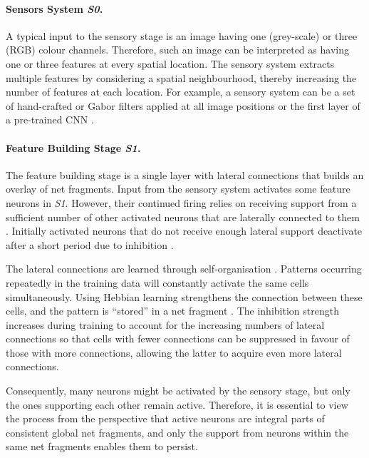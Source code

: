 \paragraph{Sensors System \emph{S0}.} A typical input to the sensory stage is an image having one (grey-scale) or three (RGB) colour channels. Therefore, such an image can be interpreted as having one or three features at every spatial location.
The sensory system extracts multiple features by considering a spatial neighbourhood, thereby increasing the number of features at each location.
For example, a sensory system can be a set of hand-crafted or Gabor filters  applied at all image positions or the first layer of a pre-trained CNN .

\paragraph{Feature Building Stage \emph{S1}.} The feature building stage is a single layer with lateral connections  that builds an overlay of net fragments. Input from the sensory system activates some feature neurons in \emph{S1}. However, their continued firing relies on receiving support from a sufficient number of other activated neurons that are laterally connected to them . Initially activated neurons that do not receive enough lateral support deactivate after a short period due to inhibition .

The lateral connections are learned through self-organisation . Patterns occurring repeatedly in the training data will constantly activate the same cells simultaneously. Using Hebbian learning \cite{hebb_organization_1949} strengthens the connection between these cells, and the pattern is ``stored'' in a net fragment \cite{von_der_malsburg_concerning_2018}. The inhibition strength increases during training to account for the increasing numbers of lateral connections so that cells with fewer connections can be suppressed in favour of those with more connections, allowing the latter to acquire even more lateral connections.

Consequently, many neurons might be activated by the sensory stage, but only the ones supporting each other remain active.
Therefore, it is essential to view the process from the perspective that active neurons are integral parts of consistent global net fragments, and only the support from neurons within the same net fragments enables them to persist.

